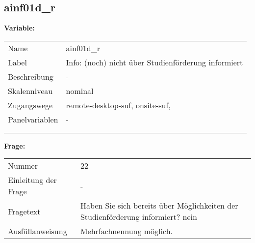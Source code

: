 	
	
	\subsection{ainf01d\_r}
	\label{subSection:ainf01d_r}

	\noindent\textbf{Variable:}\\
		\begin{tabular}{lL{11.3cm}}
			\label{tableVariable:ainf01d_r}
			Name & ainf01d\_r \\
			Label & Info: (noch) nicht über Studienförderung informiert \\
			Beschreibung & - \\
			Skalenniveau & nominal \\
			Zugangswege &
				remote-desktop-suf,
				onsite-suf,
 \\
			Panelvariablen & -
			 \\
			 \\
 \\
		\end{tabular}

		\vspace*{1 cm}
		\noindent\textbf{Frage:}\\
		\begin{tabular}{lL{11.3cm}}
			\label{tableQuestion:ainf01d_r}
			Nummer & 22 \\
			Einleitung der Frage & - \\
			Fragetext & Haben Sie sich bereits über Möglichkeiten der Studienförderung informiert?
nein \\
			Ausfüllanweisung & Mehrfachnennung möglich. \\
		\end{tabular}





